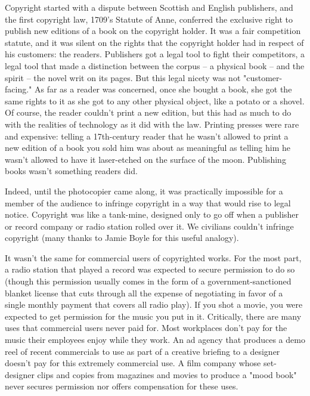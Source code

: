 Copyright started with a dispute between Scottish and English
publishers, and the first copyright law, 1709's Statute of Anne,
conferred the exclusive right to publish new editions of a book on
the copyright holder. It was a fair competition statute, and it was
silent on the rights that the copyright holder had in respect of
his customers: the readers. Publishers got a legal tool to fight
their competitors, a legal tool that made a distinction between the
corpus -- a physical book -- and the spirit -- the novel writ on
its pages. But this legal nicety was not "customer-facing." As far
as a reader was concerned, once she bought a book, she got the same
rights to it as she got to any other physical object, like a potato
or a shovel. Of course, the reader couldn't print a new edition,
but this had as much to do with the realities of technology as it
did with the law. Printing presses were rare and expensive: telling
a 17th-century reader that he wasn't allowed to print a new edition
of a book you sold him was about as meaningful as telling him he
wasn't allowed to have it laser-etched on the surface of the moon.
Publishing books wasn't something readers did.

Indeed, until the photocopier came along, it was practically
impossible for a member of the audience to infringe copyright in a
way that would rise to legal notice. Copyright was like a
tank-mine, designed only to go off when a publisher or record
company or radio station rolled over it. We civilians couldn't
infringe copyright (many thanks to Jamie Boyle for this useful
analogy).

It wasn't the same for commercial users of copyrighted works. For
the most part, a radio station that played a record was expected to
secure permission to do so (though this permission usually comes in
the form of a government-sanctioned blanket license that cuts
through all the expense of negotiating in favor of a single monthly
payment that covers all radio play). If you shot a movie, you were
expected to get permission for the music you put in it. Critically,
there are many uses that commercial users never paid for. Most
workplaces don't pay for the music their employees enjoy while they
work. An ad agency that produces a demo reel of recent commercials
to use as part of a creative briefing to a designer doesn't pay for
this extremely commercial use. A film company whose set-designer
clips and copies from magazines and movies to produce a "mood book"
never secures permission nor offers compensation for these uses.

